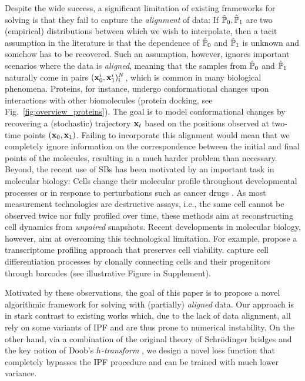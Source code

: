Despite the wide success, a significant limitation of existing frameworks for solving  is that they fail to capture the \emph{alignment} of data: If $\hat{\mathbb{P}}_{ {0} }, \hat{\mathbb{P}}_{ {1}}$ are two (empirical) distributions between which we wish to interpolate, then a tacit assumption in the literature is that the dependence of $\hat{\mathbb{P}}_{ {0} }$ and $\hat{\mathbb{P}}_{ {1}}$ is unknown and somehow has to be recovered. Such an assumption, however, ignores important scenarios where the data is \emph{aligned}, meaning that the samples from $\hat{\mathbb{P}}_{ {0} }$ and $\hat{\mathbb{P}}_{ {1}}$ naturally come in pairs $(\mathbf{x}^i_0,\mathbf{x}^i_1)_i^{N}$, which is common in many biological phenomena. Proteins, for instance, undergo conformational changes upon interactions with other biomolecules (protein docking, see Fig.~\ref{fig:overview_proteins}). The goal is to model conformational changes by recovering a (stochastic) trajectory $\mathbf{x}_t$ based on the positions observed at two-time points $\left(\mathbf{x}_0, \mathbf{x}_1\right)$. Failing to incorporate this alignment would mean that we completely ignore information on the correspondence between the initial and final points of the molecules, resulting in a much harder problem than necessary.
Beyond, the recent use of SBs has been motivated by an important task in molecular biology: Cells change their molecular profile throughout developmental processes \citep{schiebinger2019optimal,bunne2021jkonet} or in response to perturbations such as cancer drugs \citep{lotfollahi2019scgen,bunne2021learning}. As most measurement technologies are destructive assays, i.e., the same cell cannot be observed twice nor fully profiled over time, these methods aim at reconstructing cell dynamics from \emph{unpaired} snapshots.
Recent developments in molecular biology, however, aim at overcoming this technological limitation. For example, \citet{chen2022live} propose a transcriptome profiling approach that preserves cell viability. \citet{weinreb2020lineage} capture cell differentiation processes by clonally connecting cells and their progenitors through barcodes (see illustrative Figure in Supplement).

 Motivated by these observations, the goal of this paper is to propose a novel algorithmic framework for solving  with (partially) \emph{aligned} data. Our approach is in stark contrast to existing works which, due to the lack of data alignment, all rely on some variants of \acrshort{IPF} \citep{fortet1940resolution, kullback1968probability} and are thus prone to numerical instability. On the other hand, via a combination of the original theory of Schr\"odinger bridges \citep{schrodinger1931umkehrung,leonard2013survey} and the key notion of Doob's \emph{$h$-transform} \citep{doob1984classical, rogers2000diffusions}, we design a novel loss function that completely bypasses the \acrshort{IPF} procedure and can be trained with much lower variance.


